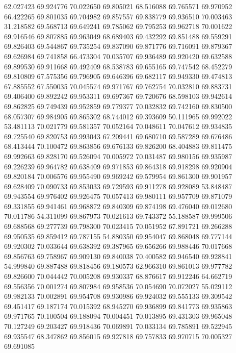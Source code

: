 62.027423
69.924776
70.022650
69.805021
68.516088
69.765571
69.970952
66.422265
69.801035
69.704982
69.857557
69.838779
69.936510
70.003463
31.218582
69.568713
69.649241
69.785062
69.795253
69.962718
70.001622
69.916546
69.807885
69.963049
68.689403
69.432292
69.851488
69.559291
69.826403
69.544867
69.735254
69.837090
69.871776
69.716091
69.879367
69.626984
69.741858
66.473304
70.035707
69.936489
69.920420
69.632588
69.899530
69.911668
69.492409
68.538783
69.655165
69.747542
68.452279
69.810809
67.575356
69.796905
69.646396
69.682117
69.949330
69.474813
67.885552
67.550035
70.045574
69.971767
69.762754
70.032810
69.883731
69.406400
69.892242
69.953311
69.697367
69.720676
68.598103
69.942614
69.862825
69.749439
69.952859
69.779377
70.032832
69.742160
69.830500
68.057307
69.984905
69.865302
68.744012
69.393609
50.111965
69.992022
53.481113
70.021779
69.581357
70.052164
70.048611
70.047612
69.934835
69.725540
69.820753
69.993043
67.209441
69.680710
69.587289
69.676486
68.413444
70.100472
69.863856
69.676133
69.826200
68.404883
69.811475
69.992663
69.828170
69.526094
70.005972
70.031487
69.980156
69.935987
69.226239
69.964782
69.638409
69.971853
69.864318
69.918298
69.920904
69.820184
70.006576
69.955490
69.969242
69.579954
69.861300
69.901957
69.628409
70.090733
69.853033
69.729593
69.911278
69.928089
53.848487
69.943554
69.976402
69.926475
70.057413
69.980111
69.957709
69.871079
69.331855
69.941461
69.968872
69.840309
69.874198
69.476040
69.012680
70.011786
54.311099
69.867973
70.021613
69.743372
55.188587
69.999506
69.688568
69.277739
69.798300
70.023415
70.051952
67.891721
69.266288
69.950535
69.859412
69.787155
54.880350
69.954047
69.868048
69.777144
69.920302
70.033644
69.638392
69.387965
69.656266
69.988446
70.017668
69.856763
69.758967
69.909130
69.840038
70.400582
69.946540
69.928841
54.999840
69.887488
69.818456
69.180573
62.966310
69.861013
69.977782
69.826600
70.044442
70.005208
69.930337
68.876617
69.912246
64.662719
69.556356
70.001274
69.807984
69.958536
70.054690
70.072027
55.029112
69.982133
70.002891
69.954708
69.930986
69.924032
69.555133
69.309542
69.451417
69.187174
70.015392
68.945270
69.936899
69.841773
69.935863
69.971765
70.100504
69.188094
70.004451
70.013895
69.431303
69.965048
70.127249
69.203427
69.918436
70.069891
70.033134
69.785891
69.522945
69.935547
68.347862
69.856015
69.927818
69.757833
69.970715
70.005327
69.691085
